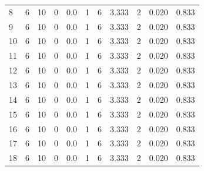 \documentclass{article}
\theoremstyle{definition}
\begin{document}
\begin{table}[!hbtp]
{\begin{tabular}{lrrrrrrrrrr}
            8  &        6 &       10 &                 0 &               0.0 &                       1 &                          6 &       3.333 &              2 &       0.020 &             0.833 \\
            9  &        6 &       10 &                 0 &               0.0 &                       1 &                          6 &       3.333 &              2 &       0.020 &             0.833 \\
            10 &        6 &       10 &                 0 &               0.0 &                       1 &                          6 &       3.333 &              2 &       0.020 &             0.833 \\
            11 &        6 &       10 &                 0 &               0.0 &                       1 &                          6 &       3.333 &              2 &       0.020 &             0.833 \\
            12 &        6 &       10 &                 0 &               0.0 &                       1 &                          6 &       3.333 &              2 &       0.020 &             0.833 \\
            13 &        6 &       10 &                 0 &               0.0 &                       1 &                          6 &       3.333 &              2 &       0.020 &             0.833 \\
            14 &        6 &       10 &                 0 &               0.0 &                       1 &                          6 &       3.333 &              2 &       0.020 &             0.833 \\
            15 &        6 &       10 &                 0 &               0.0 &                       1 &                          6 &       3.333 &              2 &       0.020 &             0.833 \\
            16 &        6 &       10 &                 0 &               0.0 &                       1 &                          6 &       3.333 &              2 &       0.020 &             0.833 \\
            17 &        6 &       10 &                 0 &               0.0 &                       1 &                          6 &       3.333 &              2 &       0.020 &             0.833 \\
            18 &        6 &       10 &                 0 &               0.0 &                       1 &                          6 &       3.333 &              2 &       0.020 &             0.833 \\

\end{tabular}}
\end{table}
\end{document}
